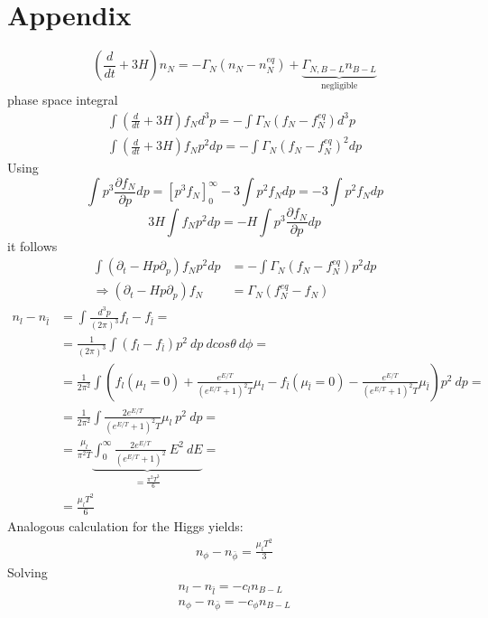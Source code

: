 \appendix
\section{Appendix}
\begin{equation*}
(\frac{d}{dt}+3H)n_N=-\Gamma_N(n_N-n_N^{eq})+\underbrace{\Gamma_{N,B-L}n_{B-L}}_\text{negligible}
\end{equation*}
phase space integral
\begin{align*}
\int (\frac{d}{dt}+3H)f_Nd^3p=-\int\Gamma_N(f_N-f_N^{eq})d^3p\\
\int (\frac{d}{dt}+3H)f_Np^2dp=-\int\Gamma_N(f_N-f_N^{eq})^2dp
\end{align*}
Using
\begin{equation*}
\int p^3\frac{\partial f_N}{\partial p}dp=\left[p^3f_N\right]_0^\infty-3\int p^2f_Ndp=-3\int p^2f_Ndp
\end{equation*}
\begin{equation*}
3H\int f_Np^2dp=-H\int p^3\frac{\partial f_N}{\partial p}dp
\end{equation*}
it follows
\begin{align*}
\int (\partial_t-Hp\partial_p)f_Np^2dp&=-\int\Gamma_N(f_N-f_N^{eq})p^2dp\\
\Rightarrow (\partial_t-Hp\partial_p)f_N&=\Gamma_N(f_N^{eq}-f_N)
\end{align*}
\newpage
\begin{align*}
	n_l-n_{\bar{l}}&=\int\frac{d^3p}{(2\pi)^3}f_l-f_{\bar{l}}=\\
	&=\frac{1}{(2\pi)^3}\int (f_l-f_{\bar{l}})p^2\:dp\:dcos\theta \:d\phi=\\
	&=\frac{1}{2\pi^2}\int\left(f_l(\mu_l=0)+\frac{e^{E/T}}{(e^{E/T}+1)^2T}\mu_l-f_{\bar{l}}(\mu_{\bar{l}}=0)-\frac{e^{E/T}}{(e^{E/T}+1)^2T}\mu_{\bar{l}}\right)p^2\:dp=\\
	&=\frac{1}{2\pi^2}\int\frac{2e^{E/T}}{(e^{E/T}+1)^2T}\mu_l\:p^2\:dp=\\
	&=\frac{\mu_l}{\pi^2T}\underbrace{\int_{0}^{\infty}\frac{2e^{E/T}}{(e^{E/T}+1)^2}\:E^2\:dE}_{=\frac{\pi^2T^3}{6}}=\\
	&=\frac{\mu_lT^2}{6}
\end{align*}
Analogous calculation for the Higgs yields:
\begin{align*}
	n_\phi-n_{\bar{\phi}}=\frac{\mu_lT^2}{3}
\end{align*}
Solving
\begin{align*}
	n_l-n_{\bar{l}}=-c_ln_{B-L}\\
	n_\phi-n_{\bar{\phi}}=-c_\phi n_{B-L}
\end{align*}
